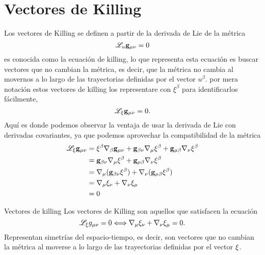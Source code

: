 \section{Vectores de Killing}
\noindent Los vectores de Killing se definen a partir de la derivada de Lie de la métrica
\begin{equation}
    \mathscr{L}_u {\mathbf{g}}_{\mu \nu} =0
\end{equation}
es conocida como la ecuación de killing, lo que representa esta ecuación es buscar vectores que no cambian la métrica, es decir, que la métrica no cambia al movernos a lo largo de las trayectorias definidas por el vector $u^\beta$.
por mera notación estos vectores de killing los representare con $\xi ^\beta$ para identificarlos fácilmente,
\begin{equation}
    \mathscr{L}_\xi {\ensuremath{\mathbf{g}}}_{\mu \nu} =0.
\end{equation}
Aquí es donde podemos observar la ventaja de usar la derivada de Lie con derivadas covariantes, ya que podemos aprovechar la compatibilidad de la métrica
\begin{equation}
    \begin{aligned}
        \mathscr{L}_\xi {\ensuremath{\mathbf{g}}}_{\mu \nu} &= \xi^\beta \mathbf{\nabla}_\beta {\ensuremath{\mathbf{g}}}_{\mu \nu} +{\mathbf{g}}_{\beta \nu}\mathbf{\nabla}_\mu \xi^\beta +{\mathbf{g}}_{\mu \beta } \mathbf{\nabla}_\nu \xi^\beta \\
        &= {\mathbf{g}}_{\beta \nu}\mathbf{\nabla}_\mu \xi^\beta +{\mathbf{g}}_{\mu \beta } \mathbf{\nabla}_\nu \xi^\beta                                                                             \\
        &= \mathbf{\nabla}_\mu ({\mathbf{g}}_{\beta \nu} \xi^\beta) + \mathbf{\nabla}_\nu ({\mathbf{g}}_{\mu \beta } \xi^\beta)                                                                       \\
        &= \mathbf{\nabla}_\mu  \xi_\nu + \mathbf{\nabla}_\nu \xi_\mu\\
        & =0             \\
    \end{aligned}
\end{equation}
\begin{definition}{Vectores de killing}{}
    Los vectores de Killing son aquellos que satisfacen la ecuación
    \begin{equation}
        \mathscr{L}_\xi g_{\mu \nu} =0   \Longleftrightarrow   \mathbf{\nabla}_\mu  \xi_\nu + \mathbf{\nabla}_\nu \xi_\mu
        =0      .
        \label{eq:killing}
    \end{equation}
    Representan simetrías del espacio-tiempo, es decir, son vectores que no cambian la métrica al moverse a lo largo de las trayectorias definidas por el vector $\mathbf{\xi}$.
    
\end{definition}
